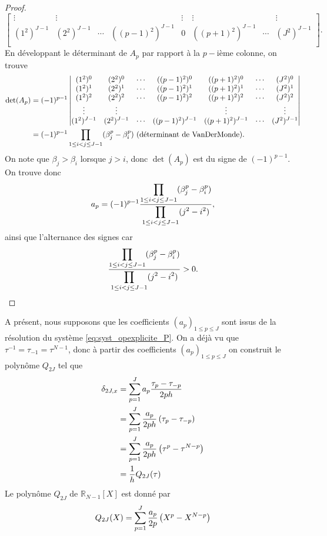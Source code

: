 \begin{proof}
\begin{equation}
\begin{bmatrix}
\vdots & \vdots &  &  & \vdots & \vdots &  & \vdots \\
(1^2)^{J-1} & (2^2)^{J-1} & \cdots & ((p-1)^2)^{J-1} & 0 & ((p+1)^2)^{J-1} & \cdots & (J^2)^{J-1} \\
\end{bmatrix} .
\end{equation}
En développant le déterminant de $A_p$ par rapport à la $p-$ième colonne, on trouve
\begin{align*}
\det (A_p) & = (-1)^{p-1}  \begin{vmatrix}
(1^2)^0 & (2^2)^0 & \cdots & ((p-1)^2)^0 & ((p+1)^2)^0 & \cdots & (J^2)^0 \\ 
(1^2)^1 & (2^2)^1 & \cdots & ((p-1)^2)^1 & ((p+1)^2)^1 & \cdots & (J^2)^1 \\
(1^2)^2 & (2^2)^2 & \cdots & ((p-1)^2)^2 & ((p+1)^2)^2 & \cdots & (J^2)^2 \\
\vdots & \vdots &  &  & \vdots & & \vdots \\
(1^2)^{J-1} & (2^2)^{J-1} & \cdots & ((p-1)^2)^{J-1} & ((p+1)^2)^{J-1} & \cdots & (J^2)^{J-1} \\
\end{vmatrix} \\
	& = (-1)^{p-1} \displaystyle\prod\limits_{1 \leq i <j \leq J-1}(\beta_j^p - \beta_i^p) \text{ (déterminant de VanDerMonde).}
\end{align*}
On note que $\beta_j > \beta_i$ lorsque $j>i$, donc $\det (A_p)$ est du signe de $(-1)^{p-1}$.
On trouve donc 
\begin{equation}
a_p = (-1)^{p-1} \dfrac{\displaystyle\prod\limits_{1 \leq i <j \leq J-1}(\beta_j^p - \beta_i^p)}{\displaystyle\prod\limits_{1 \leq i <j \leq J-1}(j^2 - i^2)},
\end{equation}
ainsi que l'alternance des signes car
\begin{equation}
\dfrac{\displaystyle\prod\limits_{1 \leq i <j \leq J-1}(\beta_j^p - \beta_i^p)}{\displaystyle\prod\limits_{1 \leq i <j \leq J-1}(j^2 - i^2)} > 0.
\end{equation}
\end{proof}

A présent, nous supposons que les coefficients $(a_p)_{1 \leq p \leq J}$ sont issus de la résolution du système \eqref{eq:syst_opexplicite_P}. On a déjà vu que $\tau^{-1} = \tau_{-1} = \tau^{N-1}$, donc à partir des coefficients $(a_p)_{1 \leq p \leq J}$ on construit le polynôme $Q_{2J}$ tel que
\begin{align*}
\delta_{2J,x} & = \displaystyle\sum\limits_{p=1}^J a_p \dfrac{\tau_p - \tau_{-p}}{2ph}\\
	& = \displaystyle\sum\limits_{p=1}^J \dfrac{a_p}{2ph} \left( \tau_p - \tau_{-p} \right)\\
	& = \displaystyle\sum\limits_{p=1}^J \dfrac{a_p}{2ph} \left( \tau^p - \tau^{N-p} \right)\\
	& = \dfrac{1}{h} Q_{2J}(\tau)
\end{align*}
Le polynôme $Q_{2J}$ de $\mathbb{R}_{N-1}[X]$ est donné par
\begin{equation}
Q_{2J}(X) = \displaystyle\sum\limits_{p=1}^J \dfrac{a_p}{2p} \left( X^p - X^{N-p} \right)
\end{equation}


